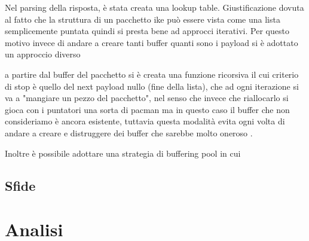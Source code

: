 Nel parsing della risposta, è stata creata una lookup table. 
Giustificazione dovuta al fatto che la struttura di un pacchetto ike può essere vista come una lista semplicemente puntata
quindi si presta bene ad approcci iterativi. Per questo motivo invece di andare a creare tanti buffer quanti sono i payload si è adottato un approccio diverso

a partire dal buffer del pacchetto si è creata una funzione ricorsiva il cui criterio di stop è quello del next payload nullo (fine della lista), che ad ogni iterazione
si va a "mangiare un pezzo del pacchetto", nel senso che invece che riallocarlo si gioca con i puntatori
una sorta di pacman ma in questo caso il buffer che non consideriamo è ancora esistente, tuttavia questa modalità evita ogni volta di andare a creare e distruggere dei buffer che
sarebbe molto oneroso .

Inoltre è possibile adottare una strategia di buffering pool in cui 

\subsection{Sfide}


\section{Analisi}


